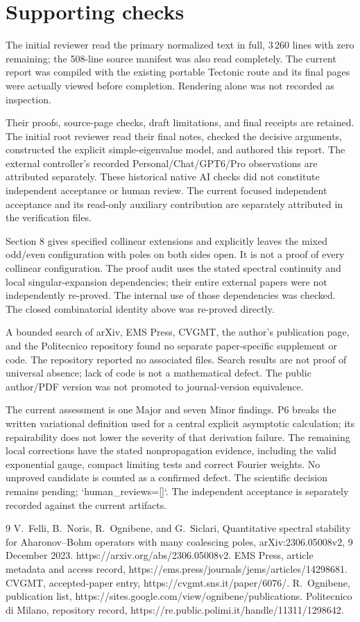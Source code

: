 \documentclass[10pt]{article}
\begin{document}
\section*{Supporting checks}
The initial reviewer read the primary normalized text in full, 3 260 lines with zero remaining; the 508-line source manifest was also read completely. The current report was compiled with the existing portable Tectonic route and its final pages were actually viewed before completion. Rendering alone was not recorded as inspection.\par
Their proofs, source-page checks, draft limitations, and final receipts are retained. The initial root reviewer read their final notes, checked the decisive arguments, constructed the explicit simple-eigenvalue model, and authored this report. The external controller’s recorded Personal/Chat/GPT6/Pro observations are attributed separately. These historical native AI checks did not constitute independent acceptance or human review. The current focused independent acceptance and its read-only auxiliary contribution are separately attributed in the verification files.\par
Section 8 gives specified collinear extensions and explicitly leaves the mixed odd/even configuration with poles on both sides open. It is not a proof of every collinear configuration. The proof audit uses the stated spectral continuity and local singular-expansion dependencies; their entire external papers were not independently re-proved. The internal use of those dependencies was checked. The closed combinatorial identity above was re-proved directly.\par
A bounded search of arXiv, EMS Press, CVGMT, the author’s publication page, and the Politecnico repository found no separate paper-specific supplement or code. The repository reported no associated files. Search results are not proof of universal absence; lack of code is not a mathematical defect. The public author/PDF version was not promoted to journal-version equivalence.\par
The current assessment is one Major and seven Minor findings. P6 breaks the written variational definition used for a central explicit asymptotic calculation; its repairability does not lower the severity of that derivation failure. The remaining local corrections have the stated nonpropagation evidence, including the valid exponential gauge, compact limiting tests and correct Fourier weights. No unproved candidate is counted as a confirmed defect. The scientific decision remains pending; `human\_reviews=[]`. The independent acceptance is separately recorded against the current artifacts.\par
9 V. Felli, B. Noris, R. Ognibene, and G. Siclari, Quantitative spectral stability for Aharonov–Bohm operators with many coalescing poles, arXiv:2306.05008v2, 9 December 2023. https://arxiv.org/abs/2306.05008v2. EMS Press, article metadata and access record, https://ems.press/journals/jems/articles/14298681. CVGMT, accepted-paper entry, https://cvgmt.sns.it/paper/6076/. R. Ognibene, publication list, https://sites.google.com/view/ognibene/publications. Politecnico di Milano, repository record, https://re.public.polimi.it/handle/11311/1298642.\par
\end{document}
